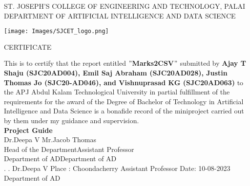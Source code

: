 \newpage

\thispagestyle{empty}
\begin{center}
\normalsize{ST. JOSEPH’S COLLEGE OF ENGINEERING AND TECHNOLOGY, PALAI}\\[0.5cm]
\normalsize
 { DEPARTMENT OF ARTIFICIAL INTELLIGENCE AND DATA SCIENCE}\\[1.0cm]%
   \begin{center}
   \texttt{[image: Images/SJCET\_logo.png]}
   \end{center}
{\large CERTIFICATE}\\[1.5cm]
\end{center}
\normalsize 
This is to certify that the report entitled {\bf $"$Marks2CSV$"$} submitted by { \bf Ajay T Shaju (SJC20AD004), Emil Saj Abraham (SJC20AD028), Justin Thomas Jo (SJC20-AD046), and Vishnuprasad KG (SJC20AD063)} to the APJ Abdul Kalam Technological University in partial fulfillment of the requirements for the award of the Degree of Bachelor of Technology in Artificial Intelligence and Data Science is a bonafide record of the miniproject carried out by them under my guidance and supervision.\vspace{1.3 cm}\\
{\bf Project Guide}\hspace{8.35 cm}{\bf Project Coordinator}\\
Dr.Deepa V\hspace{9.0 cm} Mr.Jacob Thomas\\
Head of the Department\hspace{6.85 cm}Assistant Professor\hspace{2.6 cm}\\Department of AD\hspace{7.9 cm}Department of AD
\vspace{1.3 cm}\\
.\hspace{11.06 cm}{\bf Head of the Department}
\newline
.\hspace{11.01 cm} Dr.Deepa V
\newline
Place : Choondacherry  \hspace{6.87 cm} Assistant Professor
\newline
Date\hspace{0.25 cm}: 10-08-2023 \hspace{7.7 cm} Department of AD      





